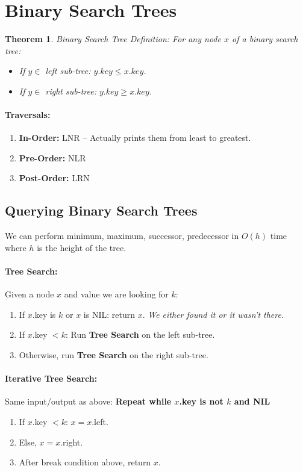 \documentclass[a4paper,12pt]{report}
\newtheorem{theorem}{Theorem}
\begin{document}
\section{Binary Search Trees}

\begin{theorem}{Binary Search Tree Definition:}
For any node $x$ of a binary search tree: 
\begin{itemize}
\item If $y\in $ left sub-tree: $y.key \leq x.key$.
\item If $y\in $ right sub-tree: $y.key \geq x.key$.
\end{itemize}
\end{theorem}


\paragraph{Traversals: } 
\begin{enumerate}
\item \textbf{In-Order: } LNR -- Actually prints them from least to greatest.
\item \textbf{Pre-Order: } NLR
\item \textbf{Post-Order: } LRN
\end{enumerate}


\subsection{Querying Binary Search Trees}

We can perform minimum, maximum, successor, predecessor in $O(h)$ time where $h$ is the height of the tree.

\paragraph{Tree Search: } Given a node $x$ and value we are looking for $k$:
\begin{enumerate}
\item If $x$.key is $k$ or $x$ is NIL: return $x$. \textit{We either found it or it wasn't there}.
\item If $x$.key $< k$: Run \textbf{Tree Search} on the left sub-tree.
\item Otherwise, run \textbf{Tree Search} on the right sub-tree.
\end{enumerate}

\paragraph{Iterative Tree Search: } Same input/output as above: \textbf{Repeat while $x$.key is not $k$ and NIL} 
\begin{enumerate}
\item If $x$.key $<k$: $x = x$.left.
\item Else, $x = x$.right.
\item After break condition above, return $x$.
\end{enumerate}
\end{document}
